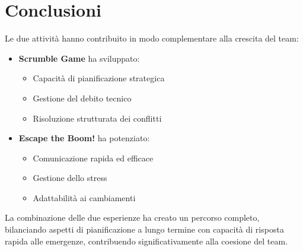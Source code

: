 \documentclass{article}
\begin{document}
\section*{Conclusioni}
Le due attività hanno contribuito in modo complementare alla crescita del team:

\begin{itemize}
    \item \textbf{Scrumble Game} ha sviluppato:
    \begin{itemize}
        \item Capacità di pianificazione strategica
        \item Gestione del debito tecnico
        \item Risoluzione strutturata dei conflitti
    \end{itemize}
    
    \item \textbf{Escape the Boom!} ha potenziato:
    \begin{itemize}
        \item Comunicazione rapida ed efficace
        \item Gestione dello stress
        \item Adattabilità ai cambiamenti
    \end{itemize}
\end{itemize}

La combinazione delle due esperienze ha creato un percorso completo, bilanciando aspetti di pianificazione a lungo termine con capacità di risposta rapida alle emergenze, contribuendo significativamente alla coesione del team.
\end{document}
